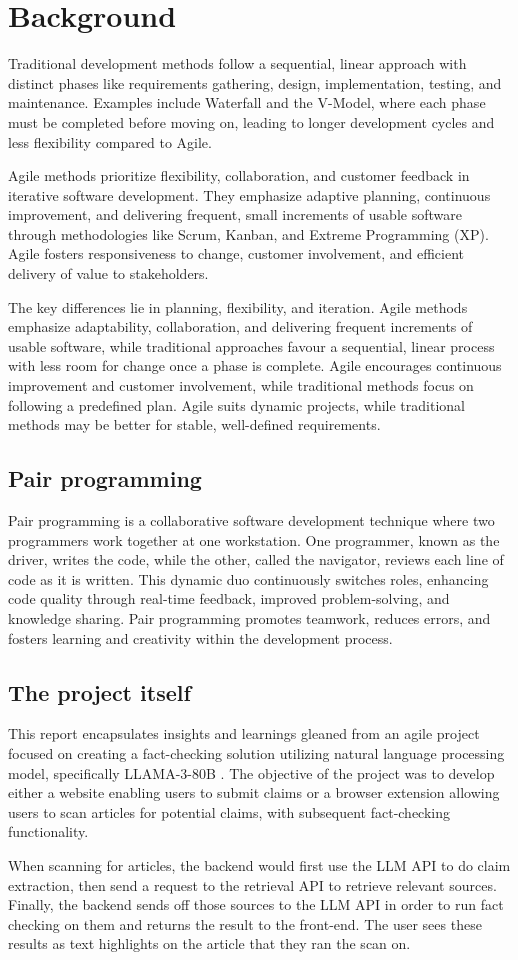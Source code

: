 \section{Background}
Traditional development methods follow a sequential, linear approach with distinct phases like requirements gathering, design, implementation, testing, and maintenance. Examples include Waterfall and the V-Model, where each phase must be completed before moving on, leading to longer development cycles and less flexibility compared to Agile.

Agile methods prioritize flexibility, collaboration, and customer feedback in iterative software development. They emphasize adaptive planning, continuous improvement, and delivering frequent, small increments of usable software through methodologies like Scrum, Kanban, and Extreme Programming (XP). Agile fosters responsiveness to change, customer involvement, and efficient delivery of value to stakeholders.

The key differences lie in planning, flexibility, and iteration. Agile methods emphasize adaptability, collaboration, and delivering frequent increments of usable software, while traditional approaches favour a sequential, linear process with less room for change once a phase is complete. Agile encourages continuous improvement and customer involvement, while traditional methods focus on following a predefined plan. Agile suits dynamic projects, while traditional methods may be better for stable, well-defined requirements.

\subsection{Pair programming}
Pair programming is a collaborative software development technique where two programmers work together at one workstation. One programmer, known as the driver, writes the code, while the other, called the navigator, reviews each line of code as it is written. This dynamic duo continuously switches roles, enhancing code quality through real-time feedback, improved problem-solving, and knowledge sharing. Pair programming promotes teamwork, reduces errors, and fosters learning and creativity within the development process.


\subsection{The project itself}
This report encapsulates insights and learnings gleaned from an agile project focused on creating a fact-checking solution utilizing natural language processing model, specifically LLAMA-3-80B \cite{llama3}. The objective of the project was to develop either a website enabling users to submit claims or a browser extension allowing users to scan articles for potential claims, with subsequent fact-checking functionality. 

When scanning for articles, the backend would first use the LLM API to do claim extraction, then send a request to the retrieval API to retrieve relevant sources. Finally, the backend sends off those sources to the LLM API in order to run fact checking on them and returns the result to the front-end. The user sees these results as text highlights on the article that they ran the scan on.
